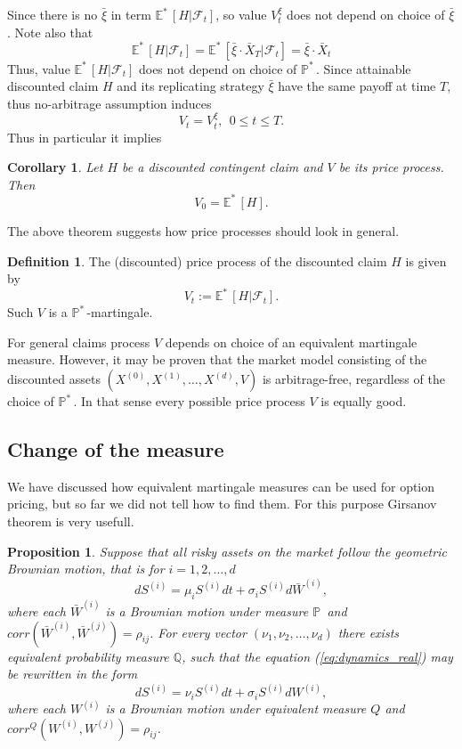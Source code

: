 \documentclass[a4paper,12pt, oneside]{book}
\newtheorem{prop}[thm]{Proposition}
\newtheorem{coro}[thm]{Corollary}
\theoremstyle{definition}
\newtheorem{mydef}{Definition}[section]
\theoremstyle{remark}
\def\P{{\mathbb{P}}\,}
\def\Em{{\mathbb{E}^*}\,}
\def\Pm{{\mathbb{P}}^*\,}
\def\Xa{\bar{X}}
\def\xia{\bar{\xi}}
\begin{document}
Since there is no $\xia$ in term $\Em[H | \mathcal{F}_t]$, so value $V^\xi_t$ does not depend on choice of $\xia$. Note also that
\begin{equation*}
 \Em[H | \mathcal{F}_t]  = \Em[\xia \cdot \Xa_T | \mathcal{F}_t]  = \xia \cdot \Xa_t
\end{equation*}
Thus, value $\Em[H | \mathcal{F}_t]$ does not depend on choice of $\Pm$. 
Since attainable discounted claim $H$ and its replicating strategy $\xia$ have the same payoff at time $T$, thus no-arbitrage assumption induces
\[ V_t = V^\xi_t,\ \ 0 \leq t \leq T. \]
Thus in particular it implies
\begin{coro}
\label{coro:price_mth}
Let $H$ be a discounted contingent claim and $V$ be its price process. Then
\begin{equation}
 \label{eq:price_mtg}
 V_0 = \Em[H].
\end{equation}
\end{coro}


The above theorem suggests how price processes should look in general.
\begin{mydef}
 The (discounted) price process of the discounted claim $H$ is given by
 \begin{equation*}
  V_t := \Em[H | \mathcal{F}_t].
 \end{equation*}
 Such $V$ is a $\Pm$-martingale.
\end{mydef}
For general claims process $V$ depends on choice of an equivalent martingale measure. However, it may be proven that the market model consisting of the discounted assets $(X^{(0)}, X^{(1)},\ldots,X^{(d)}, V)$ is arbitrage-free, regardless of the choice of $\Pm$. In that sense every possible price process $V$ is equally good.

\subsection{Change of the measure}
We have discussed how equivalent martingale measures can be used for option pricing, but so far we did not tell how to find them. For this purpose Girsanov theorem is very usefull.

\begin{prop}
\label{prop:measure_change}
 Suppose that all risky assets on the market follow the geometric Brownian motion, that is for $i=1,2,\ldots,d$
 \begin{equation}
  \label{eq:dynamics_real}
  dS^{(i)} = \mu_i S^{(i)} dt + \sigma_i S^{(i)} d\bar{W}^{(i)},
 \end{equation}
 where each $\bar{W}^{(i)}$ is a Brownian motion under measure $\P$ and $corr(\bar{W}^{(i)}, \bar{W}^{(j)}) = \rho_{ij}$. For every vector $(\nu_1, \nu_2, \ldots, \nu_d)$ there exists equivalent probability measure $\mathbb{Q}$, such that the equation (\ref{eq:dynamics_real}) may be rewritten in the form
  \begin{equation}
  dS^{(i)} = \nu_i S^{(i)} dt + \sigma_i S^{(i)} dW^{(i)},
 \end{equation}
 where each $W^{(i)}$ is a Brownian motion under equivalent measure $Q$ and\\ $corr^Q(W^{(i)}, W^{(j)}) = \rho_{ij}$.
\end{prop}
\end{document}
